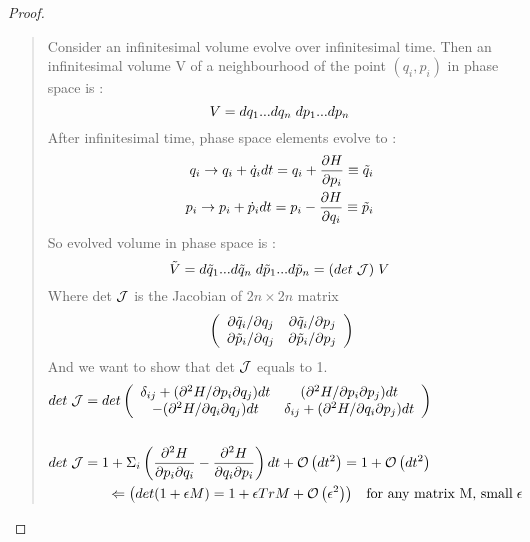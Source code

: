 \documentclass[final]{IEEEphot}
\newcommand{\PD}[2]{\dfrac{\partial #1}{\partial #2}} %
\newcommand{\HOT}[1]{\mathcal{O}\left( #1 \right)} %
\newcommand{\HS}{\hspace{0.3cm}} %
\newcommand{\VS}{\vspace{0.3cm}} %
\newcommand{\hs}{\hspace{0.1cm}} %
\newcommand{\vs}{\vspace{0.1cm}} %
\begin{document}
\begin{proof}

\begin{quote}
Consider an infinitesimal volume evolve over infinitesimal time. Then an infinitesimal volume V of a neighbourhood of the point $(q_i,p_i)$ in phase space is :
\begin{equation}
 V=dq_1 ...dq_n \hs dp_1 ... dp_n
\end{equation}
After infinitesimal time, phase space elements evolve to :
\begin{gather}
 \begin{split}
  q_i \rightarrow q_i + \dot{q}_idt = q_i + \PD{H}{p_i}\equiv\Tilde{q}_i \\
  p_i \rightarrow p_i + \dot{p}_idt = p_i - \PD{H}{q_i}\equiv\Tilde{p}_i
 \end{split}
\end{gather}
So evolved volume in phase space is :
\begin{equation}
  \Tilde{V}=d\Tilde{q}_1 ...d\Tilde{q}_n \hs d\Tilde{p}_1 ... d\Tilde{p}_n=(det\hs \mathcal{J})\hs V
\end{equation}
Where det$\hs\mathcal{J}$ is the Jacobian of $2n \times 2n$ matrix \vs
\begin{equation}
\hs \left(
\begin{array}{cc}
 \partial\Tilde{q}_i/\partial q_j & \partial\Tilde{q}_i/\partial p_j \\ \partial\Tilde{p}_i/\partial q_j & \partial\Tilde{p}_i/\partial p_j
\end{array}
\right)
\end{equation}\vs
And we want to show that det$\hs\mathcal{J}$ equals to 1.
\VS
\begin{gather}
 \begin{split}
  det\hs\mathcal{J} &= det  
\left(
\begin{array}{cc}
 \delta_{ij} + (\partial^2 H/\partial p_i \partial q_j)dt & (\partial^2 H/\partial p_i \partial p_j)dt \\ -(\partial^2 H/\partial q_i \partial q_j)dt & \delta_{ij} + (\partial^2 H/\partial q_i \partial p_j)dt
\end{array}
\right) \\ \\ 
det\hs\mathcal{J} &= 1+\Sigma_i \left( \frac{\partial^2 H}{\partial p_i \partial q_i}-\frac{\partial^2 H}{\partial q_i \partial p_i}\right)dt + \HOT{dt^2}=1+\HOT{dt^2} \\
&\HS\HS\Leftarrow\left(det(1+\epsilon M)=1+\epsilon TrM +\HOT{\epsilon^2}\right) \HS \textnormal{for any matrix M, small}\hs \epsilon 
 \end{split}
\end{gather}
\end{quote}

\end{proof}
\end{document}
